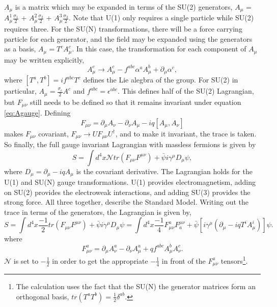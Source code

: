 \documentclass[12pt]{article}
\begin{document}
$A_\mu$ is a matrix which may be expanded in terms of the SU(2) generators, $A_\mu$ = $A^1_{\mu}\frac{\sigma_1}{2}$ + $A^2_{\mu}\frac{\sigma_2}{2}$ + $A^3_{\mu}\frac{\sigma_3}{2}$. Note that U(1) only requires a single particle while SU(2) requires three. For the SU(N) transformations, there will be a force carrying particle for each generator, and the field may be expanded using the generators as a basis, $A_\mu = T^cA^c_\mu$. In this case, the transformation for each component of $A_\mu$ may be written explicitly, 
\begin{equation}
\label{eq:Agauge}
A^c_\mu \rightarrow A^c_\mu - f^{abc}\alpha^a A^b_\mu + \partial_\mu\alpha^c, 
\end{equation}
where $[T^a,T^b]=if^{abc}T^c$ defines the Lie alegbra of the group. For SU(2) in particular, $A_\mu = \frac{\sigma_c}{2}A^c$ and $f^{abc} = \epsilon^{abc}$.
This defines half of the SU(2) Lagrangian, but $F_{\mu\nu}$ still needs to be defined so that it remains invariant under equation \ref{eq:Agauge}. Defining 
\begin{equation}
F_{\mu\nu} = \partial_\mu A_\nu - \partial_\nu A_\mu - iq[A_\mu,A_\nu] 
\end{equation}
makes $F_{\mu\nu}$ covariant, $F_{\mu\nu} \rightarrow UF_{\mu\nu}U^\dagger$, \cite{zee} and to make it invariant, the trace is taken. So finally, the full gauge invariant Lagrangian with massless fermions is given by
\begin{equation}
S = \int d^4x \mathcal{N}tr(F_{\mu\nu}F^{\mu\nu}) + \bar{\psi}i\gamma^\mu D_\mu\psi,
\end{equation}
where $D_\mu = \partial_\mu - iqA_\mu$ is the covariant derivative. The Lagrangian holds for the U(1) and SU(N) gauge transformations. U(1) provides electromagnetism, adding on SU(2) provides the electroweak interactions, and adding SU(3) provides the strong force. All three together, describe the Standard Model. Writing out the trace in terms of the generators, the Lagrangian is given by, 
\begin{equation}
\label{eq:ewlagrangian}
S = \int d^4x \frac{-1}{2}tr(F_{\mu\nu}F^{\mu\nu}) + \bar{\psi}i\gamma^\mu D_\mu\psi 
  = \int d^4x \frac{-1}{4}F^a_{\mu\nu}F_a^{\mu\nu} + \bar{\psi}\left[i\gamma^\mu\left(\partial_\mu - iqT^iA^i_\mu\right)\right]\psi. 
\end{equation}
where
\begin{equation}
F^a_{\mu\nu} = \partial_\mu A^a_\nu - \partial_\nu A^a_\mu + qf^{abc}A^b_\mu A^c_\nu. 
\end{equation}
$\mathcal{N}$ is set to $-\frac{1}{2}$ in order to get the appropriate $-\frac{1}{4}$ in front of the $F^a_{\mu\nu}$ tensors\footnote{The calculation uses the fact that the SU(N) the generator matrices form an orthogonal basis, $tr(T^aT^b) = \frac{1}{2}\delta^{ab}$.}.
\end{document}
